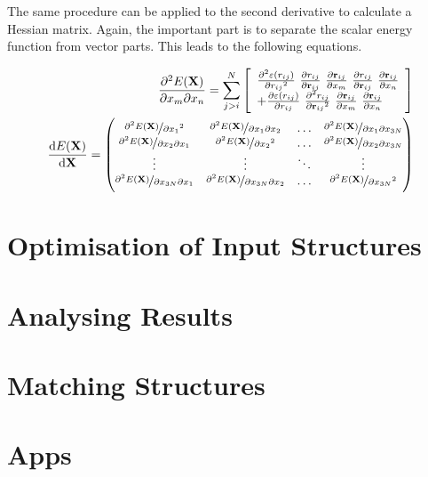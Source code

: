 The same procedure can be applied to the second derivative to calculate a
Hessian matrix. Again, the important part is to separate the scalar energy
function from vector parts. This leads to the following equations.

\begin{align}
    \frac{\partial^2 E(\mathbf{X})}{\partial x_m\partial x_n}=\sum_{j>i}^N\left[  
    \begin{array}{ll}
    \frac{\partial^2 \varepsilon(r_{ij})}{\partial {r_{ij}}^2}\  
    \frac{\partial r_{ij}}{\partial\mathbf{r}_{ij}}\ 
    \frac{\partial\mathbf{r}_{ij}}{\partial x_m}\ 
    \frac{\partial r_{ij}}{\partial\mathbf{r}_{ij}}\ 
    \frac{\partial\mathbf{r}_{ij}}{\partial x_n} \\ 
    +
    \frac{\partial \varepsilon(r_{ij})}{\partial r_{ij}}\
    \frac{\partial^2 r_{ij}}{\partial {\mathbf{r}_{ij}}^2}\ 
    \frac{\partial\mathbf{r}_{ij}}{\partial x_m}\ 
    \frac{\partial\mathbf{r}_{ij}}{\partial x_n} 
    \end{array}
    \right]\\
    \frac{\dif E(\mathbf{X})}{\dif\mathbf{X}}=
    \begin{pmatrix}
        \nicefrac{\partial^2 E(\mathbf{X})}{{\partial x_1}^2} & \nicefrac{\partial^2 E(\mathbf{X})}{\partial x_1\partial x_2} & \ldots & \nicefrac{\partial^2 E(\mathbf{X})}{\partial x_1\partial x_{3N}}\\
        \nicefrac{\partial^2 E(\mathbf{X})}{\partial x_2\partial x_1} & \nicefrac{\partial^2 E(\mathbf{X})}{{\partial x_2}^2} & \ldots & \nicefrac{\partial^2 E(\mathbf{X})}{\partial x_2\partial x_{3N}}\\
        \vdots & \vdots & \ddots & \vdots\\
        \nicefrac{\partial^2 E(\mathbf{X})}{\partial x_{3N}\partial x_1} & \nicefrac{\partial^2 E(\mathbf{X})}{\partial x_{3N}\partial x_2} & \ldots & \nicefrac{\partial^2 E(\mathbf{X})}{{\partial x_{3N}}^2}
    \end{pmatrix}
\end{align}


\section{Optimisation of Input Structures}
\label{sec:optimisationofinputstructures}

\section{Analysing Results}
\label{sec:analysingresults}

\section{Matching Structures}
\label{sec:matchingstructures}

\section{Apps}
\label{sec:apps}
